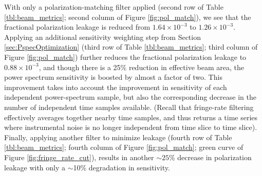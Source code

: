 \documentclass[twocolumn,apj,numberedappendix]{emulateapj}
\begin{document}
With only a polarization-matching filter applied (second row of Table \ref{tbl:beam_metrics}; second column of Figure \ref{fig:pol_match}), we see that
the fractional polarization leakage is reduced from $1.64 \times 10^{-3}$ to $1.26 \times 10^{-3}$. Applying
an additional sensitivity weighting step from Section \ref{sec:PspecOptimization} (third row of Table \ref{tbl:beam_metrics}; third column of Figure \ref{fig:pol_match}) further reduces the fractional
polarization leakage to $0.88 \times 10^{-3}$, and though there is a 25\% reduction in effective
beam area, the power spectrum sensitivity is boosted by almost a factor of two. This improvement takes
into account the improvement in sensitivity of each independent power-spectrum sample, but
also the corresponding decrease in the number of independent time samples available. (Recall that fringe-rate filtering
effectively averages together nearby time samples, and thus returns a time series where instrumental noise
is no longer independent from time slice to time slice). Finally, applying
another filter to minimize leakage (fourth row of Table \ref{tbl:beam_metrics}; fourth column of Figure \ref{fig:pol_match}; green curve of Figure \ref{fig:fringe_rate_cut}), results in another $\sim25$\% decrease in polarization leakage with only a $\sim$10\% degradation
in sensitivity.


\end{document}
